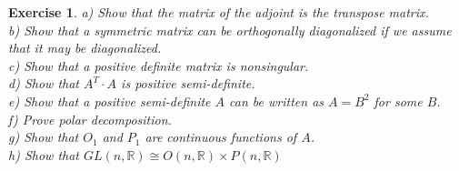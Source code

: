 \documentclass{article}
\newtheorem{exercise}{Exercise}
\begin{document}
\begin{exercise}
  a) Show that the matrix of the adjoint is the transpose matrix. \\
  b) Show that a symmetric matrix can be orthogonally diagonalized if we assume that it may be diagonalized. \\
  c) Show that a positive definite matrix is nonsingular. \\
  d) Show that $A^{T}\cdot A$ is positive semi-definite. \\
  e) Show that a positive semi-definite $A$ can be written as $A = B^{2}$ for some $B$. \\
  f) Prove polar decomposition. \\
  g) Show that $O_{1}$ and $P_{1}$ are continuous functions of $A$. \\
  h) Show that $GL(n,\mathbb{R}) \cong O(n, \mathbb{R}) \times P(n, \mathbb{R})$ 
\end{exercise}
\end{document}
